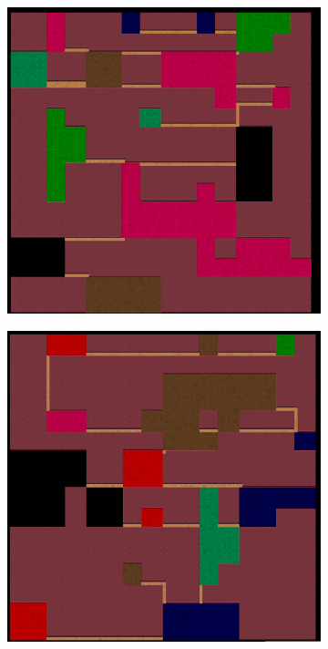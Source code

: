 \begin{figure}[H]
\begin{subfigure}{.5\textwidth}
  \centering
  \includegraphics[width=.8\linewidth]{../images/colored_rooms/c_1.png}
  \label{fig:sfig1}
\end{subfigure}%
\begin{subfigure}{.5\textwidth}
  \centering
  \includegraphics[width=.8\linewidth]{../images/colored_rooms/c_2.png}
  \label{fig:sfig2}
\end{subfigure}
\begin{subfigure}{.5\textwidth}
  \centering

\end{subfigure}
\end{figure}
